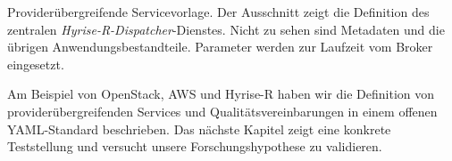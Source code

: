 \begin{listing}[ht]	
	\inputminted[firstline=15]{yaml}{./src/hyrise-r.sample.yaml}
	\caption{Providerübergreifende Servicevorlage. Der Ausschnitt zeigt die Definition des zentralen \emph{Hyrise-R-Dispatcher}-Dienstes. Nicht zu sehen sind Metadaten und die übrigen Anwendungsbestandteile. Parameter werden zur Laufzeit vom Broker eingesetzt.}
	\label{listing:hyrise-r}
\end{listing}

Am Beispiel von OpenStack, AWS und Hyrise-R haben wir die Definition von providerübergreifenden Services und Qualitätsvereinbarungen in einem offenen YAML-Standard beschrieben. Das nächste Kapitel zeigt eine konkrete Teststellung und versucht unsere Forschungshypothese zu validieren.